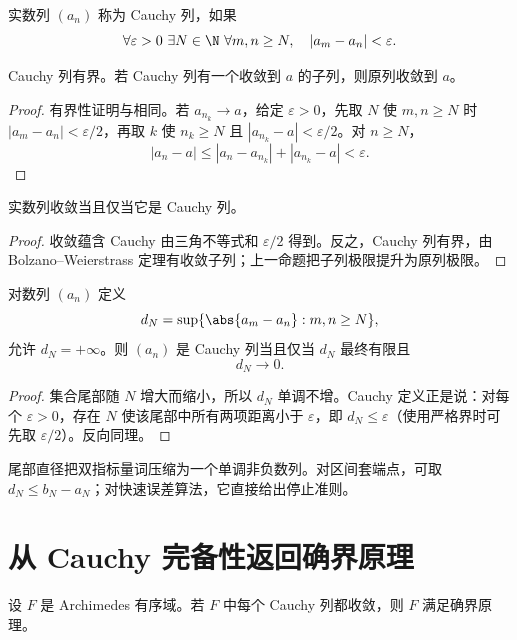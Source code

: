 \begin{definition}
实数列 \((a_n)\) 称为 Cauchy 列，如果
\[
 \forall\varepsilon>0\ \exists N\in\N\
 \forall m,n\ge N,\quad |a_m-a_n|<\varepsilon.
\]
\end{definition}

\begin{proposition}
Cauchy 列有界。若 Cauchy 列有一个收敛到 \(a\) 的子列，则原列收敛到 \(a\)。
\end{proposition}

\begin{proof}
有界性证明与相同。若 \(a_{n_k}\to a\)，给定 \(\varepsilon>0\)，先取 \(N\) 使 \(m,n\ge N\) 时 \(|a_m-a_n|<\varepsilon/2\)，再取 \(k\) 使 \(n_k\ge N\) 且 \(|a_{n_k}-a|<\varepsilon/2\)。对 \(n\ge N\)，
\[
 |a_n-a|\le|a_n-a_{n_k}|+|a_{n_k}-a|<\varepsilon.
\]
\end{proof}

\begin{theorem}
实数列收敛当且仅当它是 Cauchy 列。
\end{theorem}

\begin{proof}
收敛蕴含 Cauchy 由三角不等式和 \(\varepsilon/2\) 得到。反之，Cauchy 列有界，由 Bolzano--Weierstrass 定理有收敛子列；上一命题把子列极限提升为原列极限。
\end{proof}

\begin{proposition}[尾部直径]
对数列 \((a_n)\) 定义
\[
 d_N=\sup\{\abs{a_m-a_n}:m,n\ge N\},
\]
允许 \(d_N=+\infty\)。则 \((a_n)\) 是 Cauchy 列当且仅当 \(d_N\) 最终有限且
\[
 d_N\to0.
\]
\end{proposition}

\begin{proof}
集合尾部随 \(N\) 增大而缩小，所以 \(d_N\) 单调不增。Cauchy 定义正是说：对每个 \(\varepsilon>0\)，存在 \(N\) 使该尾部中所有两项距离小于 \(\varepsilon\)，即 \(d_N\le\varepsilon\)（使用严格界时可先取 \(\varepsilon/2\)）。反向同理。
\end{proof}

尾部直径把双指标量词压缩为一个单调非负数列。对区间套端点，可取 \(d_N\le b_N-a_N\)；对快速误差算法，它直接给出停止准则。

\section{从 Cauchy 完备性返回确界原理}

\begin{theorem}
设 \(F\) 是 Archimedes 有序域。若 \(F\) 中每个 Cauchy 列都收敛，则 \(F\) 满足确界原理。
\end{theorem}

